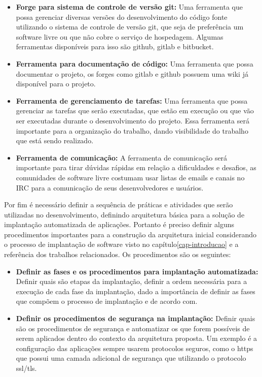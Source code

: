 \begin{itemize}
  \item \textbf{Forge para sistema de controle de versão git:} Uma ferramenta que
  possa gerenciar diversas versões do desenvolvimento do código fonte utilizando
  o sistema de controle de versão git, que seja de preferência um software livre
  ou que não cobre o serviço de hospedagem. Algumas ferramentas disponíveis para
  isso são github, gitlab e bitbucket.
  \item \textbf{Ferramenta para documentação de código:} Uma ferramenta que possa
  documentar o projeto, os forges como gitlab e github possuem uma wiki já disponível
  para o projeto.
  \item \textbf{Ferramenta de gerenciamento de tarefas:} Uma ferramenta que possa
  gerenciar as tarefas que serão executadas, que estão em execução ou que vão ser executadas
  durante o desenvolvimento do projeto. Essa ferramenta será importante para a
  organização do trabalho, dando visibilidade do trabalho que está sendo realizado.
  \item \textbf{Ferramenta de comunicação:} A ferramenta de comunicação será
  importante para tirar dúvidas rápidas em relação a dificuldades e desafios, as
  comunidades de software livre costumam usar listas de emails e canais no IRC
  para a comunicação de seus desenvolvedores e usuários.
\end{itemize}

Por fim é necessário definir a sequência de práticas e atividades que serão
utilizadas no desenvolvimento, definindo arquitetura básica para a solução de
implantação automatizada de aplicações. Portanto é preciso definir alguns
procedimentos importantes para a construção da arquitetura inicial considerando
o processo de implantação de software visto no capítulo\ref{cap-introducao}
e a referência dos trabalhos relacionados. Os procedimentos são os seguintes:

\begin{itemize}
  \item  \textbf{Definir as fases e os procedimentos para implantação automatizada:}
   Definir quais são etapas da implantação, definir a ordem necessária para a execução de
  cada fase da implantação, dado a importância de definir as fases que compõem o processo de
  implantação e de acordo com\cite{omg2006}.
  \item  \textbf{Definir os procedimentos de segurança na implantação:} Definir
  quais são os procedimentos de segurança e automatizar os que forem possíveis
  de serem aplicados dentro do contexto da arquitetura proposta. Um exemplo
  é a configuração das aplicações sempre usarem protocolos seguros, como o https
  que possui uma camada adicional de segurança que utilizando o protocolo ssl/tls.
\end{itemize}

